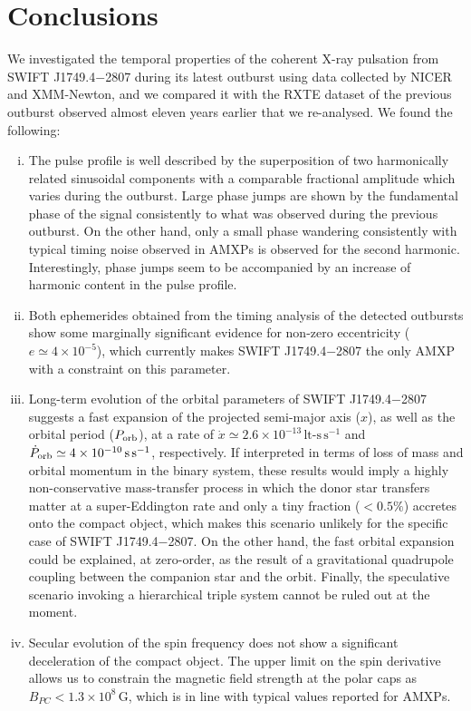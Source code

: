 \documentclass[fleqn,usenatbib]{mnras}
\newcommand{\swiftj}{SWIFT J1749.4$-$2807}
\newcommand{\nicer}{NICER}
\newcommand{\xmm}{XMM-Newton}
\newcommand{\rxte}{RXTE}
\begin{document}
\section{Conclusions}
We investigated the temporal properties of the coherent X-ray pulsation from \swiftj{} during its latest outburst using data collected by \nicer{} and \xmm{}, and we compared it with the \rxte{} dataset of the previous outburst observed almost eleven years earlier that we re-analysed. We found the following:

\begin{enumerate}[i)]
  \item The pulse profile is well described by the superposition of two harmonically related sinusoidal components with a comparable fractional amplitude which varies during the outburst. Large phase jumps are shown by the fundamental phase of the signal consistently to what was observed during the previous outburst. On the other hand, only a small phase wandering consistently with typical timing noise observed in AMXPs is observed for the second harmonic. Interestingly, phase jumps seem to be accompanied by an increase of harmonic content in the pulse profile. 
  \item Both ephemerides obtained from the timing analysis of the detected outbursts show some marginally significant evidence for non-zero eccentricity ($e\simeq4\times 10^{-5}$), which currently makes \swiftj{} the only AMXP with a constraint on this parameter.   
  \item Long-term evolution of the orbital parameters of \swiftj{} suggests a fast expansion of the projected semi-major axis ($x$), as well as the orbital period ($P_{\rm orb}$), at a rate of $\dot{x}\simeq 2.6\times 10^{-13}\,\text{lt-s}\,\text{s}^{-1}$ and $\dot{P}_{\rm orb}\simeq 4 \times 10^{-10}\,\text{s}\,\text{s}^{-1}$, respectively. If interpreted in terms of loss of mass and orbital momentum in the binary system, these results would imply a highly non-conservative mass-transfer process in which the donor star transfers matter at a super-Eddington rate and only a tiny fraction ($< 0.5\%$) accretes onto the compact object, which makes this scenario unlikely for the specific case of \swiftj{}. On the other hand, the fast orbital expansion could be explained, at zero-order, as the result of a gravitational quadrupole coupling between the companion star and the orbit. Finally, the speculative scenario invoking a hierarchical triple system cannot be ruled out at the moment.  
  \item Secular evolution of the spin frequency does not show a significant deceleration of the compact object. The upper limit on the spin derivative allows us to constrain the magnetic field strength at the polar caps as $B_{PC}<1.3\times 10^{8}\,\text{G}$, which is in line with typical values reported for AMXPs.  
\end{enumerate}
\end{document}
